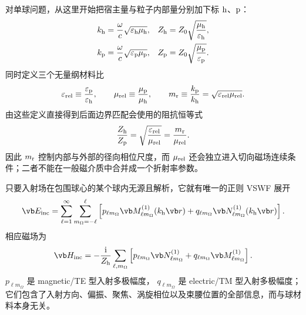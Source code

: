 对单球问题，从这里开始把宿主量与粒子内部量分别加下标 ${\rm h}$、${\rm p}$：
\begin{align}
 k_{\rm h}&=\frac{\omega}{c}\sqrt{\varepsilon_{\rm h}\mu_{\rm h}},
&
 Z_{\rm h}&=Z_0\sqrt{\frac{\mu_{\rm h}}{\varepsilon_{\rm h}}},\\
 k_{\rm p}&=\frac{\omega}{c}\sqrt{\varepsilon_{\rm p}\mu_{\rm p}},
&
 Z_{\rm p}&=Z_0\sqrt{\frac{\mu_{\rm p}}{\varepsilon_{\rm p}}}.
\label{eq:sphere-medium-kZ}
\end{align}
同时定义三个无量纲材料比
\begin{equation}
 \varepsilon_{\rm rel}\equiv\frac{\varepsilon_{\rm p}}{\varepsilon_{\rm h}},
 \qquad
 \mu_{\rm rel}\equiv\frac{\mu_{\rm p}}{\mu_{\rm h}},
 \qquad
 m_{\rm r}\equiv\frac{k_{\rm p}}{k_{\rm h}}
 =\sqrt{\varepsilon_{\rm rel}\mu_{\rm rel}}.
 \label{eq:sphere-relative-material-def}
\end{equation}
由这些定义直接得到后面边界匹配会使用的阻抗恒等式
\begin{equation}
 {
 \frac{Z_{\rm h}}{Z_{\rm p}}
 =\sqrt{\frac{\varepsilon_{\rm rel}}{\mu_{\rm rel}}}
 =\frac{m_{\rm r}}{\mu_{\rm rel}}.}
 \label{eq:impedance-ratio-mie}
\end{equation}
因此 $m_{\rm r}$ 控制内部与外部的径向相位尺度，而 $\mu_{\rm rel}$ 还会独立进入切向磁场连续条件；二者不能在一般磁介质中合并成一个折射率参数。

只要入射场在包围球心的某个球内无源且解析，它就有唯一的正则 VSWF 展开
\begin{equation}
{
\vb E_{\rm inc}
=\sum_{\ell=1}^{\infty}
\sum_{m_{\Omega}=-\ell}^{\ell}
\left[
 p_{\ell m_{\Omega}}\vb M_{\ell m_{\Omega}}^{(1)}(k_{\rm h}\vb r)
+q_{\ell m_{\Omega}}\vb N_{\ell m_{\Omega}}^{(1)}(k_{\rm h}\vb r)
\right].}
\label{eq:general-inc-vswf}
\end{equation}
相应磁场为
\begin{equation}
\vb H_{\rm inc}
=-\frac{\ii}{Z_{\rm h}}
\sum_{\ell,m_{\Omega}}
\left[
 p_{\ell m_{\Omega}}\vb N_{\ell m_{\Omega}}^{(1)}
+q_{\ell m_{\Omega}}\vb M_{\ell m_{\Omega}}^{(1)}
\right].
\label{eq:general-inc-vswf-H}
\end{equation}
$p_{\ell m_{\Omega}}$ 是 magnetic/TE 型入射多极幅度，
$q_{\ell m_{\Omega}}$ 是 electric/TM 型入射多极幅度；它们包含了入射方向、偏振、聚焦、涡旋相位以及束腰位置的全部信息，而与球材料本身无关。


